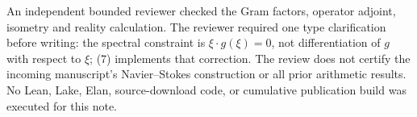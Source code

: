 An independent bounded reviewer checked the Gram factors, operator adjoint, isometry and reality calculation. The reviewer required one type clarification before writing: the spectral constraint is \(\xi\cdot g(\xi)=0\), not differentiation of \(g\) with respect to \(\xi\); (7) implements that correction. The review does not certify the incoming manuscript's Navier--Stokes construction or all prior arithmetic results. No Lean, Lake, Elan, source-download code, or cumulative publication build was executed for this note.
